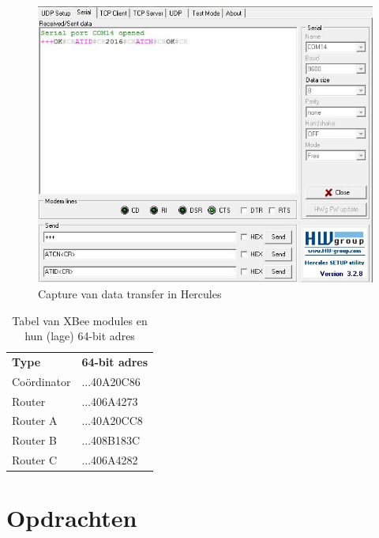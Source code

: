 \documentclass[12pt]{article}
\begin{document}
\clearpage
\begin{center}
\begin{figure}[h]
\includegraphics[scale=.8]{Terminal_output.JPG}
\caption{Capture van data transfer in Hercules}
\label{fig:output2}
\end{figure}
\end{center}
\begin{table}[h]
\begin{center}
\begin{tabular}{ll}
\rowcolor[HTML]{656565} 
\textbf{Type} & \textbf{64-bit adres} \\
Co\"{o}rdinator   & ...40A20C86           \\
Router        & ...406A4273           \\
Router A      & ...40A20CC8           \\
Router B      & ...408B183C           \\
Router C      & ...406A4282                      
\end{tabular}
\end{center}
\caption{Tabel van XBee modules en hun (lage) 64-bit adres}
\label{tab:info1}
\end{table}
\clearpage
\section{Opdrachten}
\end{document}
